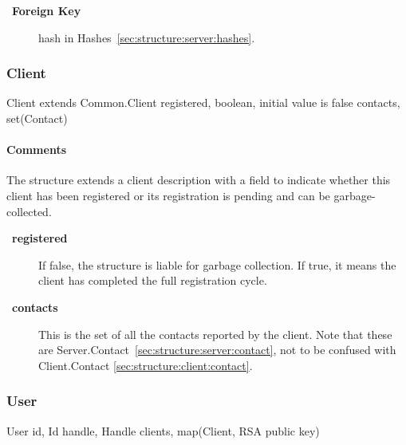 \documentclass[a4paper,10pt]{article}
\let\Item\item
\newcommand\SpecialItem{\renewcommand\item[1][]{\Item[\textbullet~\bfseries##1]}
}
\begin{document}
\SpecialItem
\begin{description}
 \item[Foreign Key] hash in Hashes~\ref{sec:structure:server:hashes}.
\end{description}

\subsubsection{Client}

\begin{verbbox}
Client extends Common.Client
{
  registered, boolean, initial value is false
  contacts, set(Contact)
}
\end{verbbox}
\begin{center}
\theverbbox
\end{center}

\begin{inparaitem}[ ]
 \item \infrastructure
\end{inparaitem}

\paragraph*{Comments}

The structure extends a client description with a field to indicate whether this client has been registered or its registration is pending and can be garbage-collected.

\SpecialItem
\begin{description}
 \item[registered] If false, the structure is liable for garbage collection. If true, it means the client has completed the full registration cycle.
 \item[contacts] This is the set of all the contacts reported by the client. Note that these are Server.Contact~\ref{sec:structure:server:contact}, not to be confused with 
Client.Contact \ref{sec:structure:client:contact}.
\end{description}

\subsubsection{User}
\label{sec:structure:server:user}

\begin{verbbox}
User
{
  id, Id
  handle, Handle
  clients, map(Client, RSA public key)
}
\end{verbbox}
\begin{center}
\theverbbox
\end{center}
\end{document}
